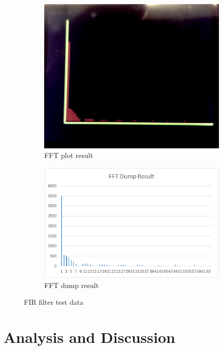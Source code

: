 \documentclass[a4paper]{article}
\newlength{\pic}
\begin{document}
\begin{figure}[htp]
\center
\begin{subfigure}[H]{\pica}
\includegraphics[width=\pica]{Images/P4}
\caption{FFT plot result}
\end{subfigure}
\hspace{5pt}
\begin{subfigure}[H]{\picb}
\center
\includegraphics[width=\picb]{Plots/P4}
\caption{FFT dump result}
\end{subfigure}
\caption{FIR filter test data}
\label{fig:Procedure4}
\end{figure}

\section{Analysis and Discussion}
\end{document}
